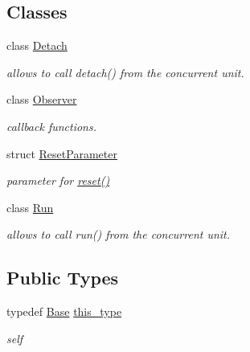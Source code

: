 \subsection*{Classes}
\begin{DoxyCompactItemize}
\item 
class \hyperlink{classhryky_1_1task_1_1worker_1_1_base_1_1_detach}{Detach}
\begin{DoxyCompactList}\small\item\em allows to call detach() from the concurrent unit. \end{DoxyCompactList}\item 
class \hyperlink{classhryky_1_1task_1_1worker_1_1_base_1_1_observer}{Observer}
\begin{DoxyCompactList}\small\item\em callback functions. \end{DoxyCompactList}\item 
struct \hyperlink{structhryky_1_1task_1_1worker_1_1_base_1_1_reset_parameter}{Reset\-Parameter}
\begin{DoxyCompactList}\small\item\em parameter for \hyperlink{classhryky_1_1task_1_1worker_1_1_base_a2dfa3093b3165d58ed31aa575ae1b159}{reset()} \end{DoxyCompactList}\item 
class \hyperlink{classhryky_1_1task_1_1worker_1_1_base_1_1_run}{Run}
\begin{DoxyCompactList}\small\item\em allows to call run() from the concurrent unit. \end{DoxyCompactList}\end{DoxyCompactItemize}
\subsection*{Public Types}
\begin{DoxyCompactItemize}
\item 
\hypertarget{classhryky_1_1task_1_1worker_1_1_base_a7e479f64d3081afe38ac8c001c784b6f}{typedef \hyperlink{classhryky_1_1task_1_1worker_1_1_base}{Base} \hyperlink{classhryky_1_1task_1_1worker_1_1_base_a7e479f64d3081afe38ac8c001c784b6f}{this\-\_\-type}}\label{classhryky_1_1task_1_1worker_1_1_base_a7e479f64d3081afe38ac8c001c784b6f}

\begin{DoxyCompactList}\small\item\em self \end{DoxyCompactList}\end{DoxyCompactItemize}
